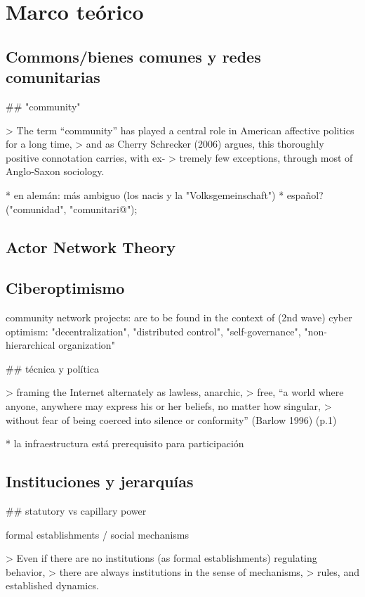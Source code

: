 \section{Marco teórico}

\subsection{Commons/bienes comunes y redes comunitarias}

## "community"

> The term “community” has played a central role in American affective politics for a long time,
> and as Cherry Schrecker (2006) argues, this thoroughly positive connotation carries, with ex-
> tremely few exceptions, through most of Anglo-Saxon sociology.

* en alemán: más ambiguo (los nacis y la "Volksgemeinschaft")
* español? ("comunidad", "comunitari@");

\subsection{Actor Network Theory}
\subsection{Ciberoptimismo}

community network projects: are to be found in the context of (2nd wave) cyber optimism: "decentralization", "distributed control", "self-governance", "non-hierarchical organization"

## técnica y política

> framing the Internet alternately as lawless, anarchic,
> free, “a world where anyone, anywhere may express his or her beliefs, no matter how singular,
> without fear of being coerced into silence or conformity” (Barlow 1996) (p.1)

* la infraestructura está prerequisito para participación

\subsection{Instituciones y jerarquías}

## statutory vs capillary power

formal establishments / social mechanisms

> Even if there are no institutions (as formal establishments) regulating behavior,
> there are always institutions in the sense of mechanisms,
> rules, and established dynamics.

